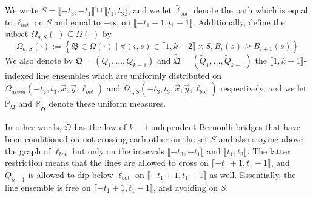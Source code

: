\begin{definition}\label{TildeDef}
	We write $S = \llbracket -t_3,-t_1\rrbracket\cup \llbracket t_1,t_3\rrbracket$, and we let $\tilde{\ell}_{bot}$ denote the path which is equal to $\ell_{bot}$ on $S$ and equal to $-\infty$ on $\llbracket -t_1 + 1, t_1 - 1\rrbracket$. Additionally, define the subset $\Omega_{a,S}(\cdot)\subseteq \Omega(\cdot)$ by 
	\begin{equation}\label{OmegaASDef}\Omega_{a,S}(\cdot):=\left\{\mathfrak{B} \in \Omega(\cdot)\mid  \forall (i,s)\in\llbracket 1,k-2\rrbracket\times S, B_{i}(s)\geq B_{i+1}(s)\right\}
	\end{equation} We also denote by $\mathfrak{Q} = (Q_1,\dots,Q_{k-1})$ and $\tilde{\mathfrak{Q}} = (\tilde{Q}_1, \dots, \tilde{Q}_{k-1})$ the $\llbracket 1, k-1 \rrbracket$-indexed line ensembles which are uniformly distributed on $\Omega_{avoid}(-t_3,t_3,\vec{x},\vec{y},\ell_{bot})$ and $\Omega_{a,S}(-t_3, t_3, \vec{x}, \vec{y}, \tilde{\ell}_{bot})$ respectively, and we let $\mathbb{P}_{\mathfrak{Q}}$ and $\mathbb{P}_{\tilde{\mathfrak{Q}}}$ denote these uniform measures.
\end{definition}
In other words, $\tilde{\mathfrak{Q}}$ has the law of $k-1$ independent Bernoulli bridges that have been conditioned on not-crossing each other on the set $S$ and also staying above the graph of $\ell_{bot}$ but only on the intervals $\llbracket-t_3, -t_1\rrbracket$ and $\llbracket t_1, t_3\rrbracket$. The latter restriction means that the lines are allowed to cross on $\llbracket -t_1+1,t_1-1\rrbracket$, and  $\tilde{Q}_{k-1}$ is allowed to dip below $\ell_{bot}$ on $\llbracket -t_1+1,t_1-1\rrbracket$ as well. Essentially, the line ensemble is free on $\llbracket -t_1+1,t_1-1\rrbracket$, and avoiding on $S$.

